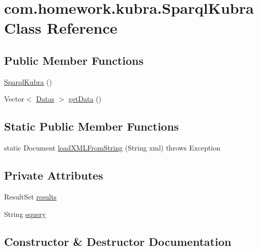 \hypertarget{classcom_1_1homework_1_1kubra_1_1_sparql_kubra}{}\section{com.\+homework.\+kubra.\+Sparql\+Kubra Class Reference}
\label{classcom_1_1homework_1_1kubra_1_1_sparql_kubra}
\subsection*{Public Member Functions}
\begin{DoxyCompactItemize}
\item 
\hyperlink{classcom_1_1homework_1_1kubra_1_1_sparql_kubra_ae62b5b33c88511096ef5a72be1a646e2}{Sparql\+Kubra} ()
\item 
Vector$<$ \hyperlink{classcom_1_1homework_1_1kubra_1_1_datas}{Datas} $>$ \hyperlink{classcom_1_1homework_1_1kubra_1_1_sparql_kubra_af79b43ae8f706a77de72ee034186ad42}{get\+Data} ()
\end{DoxyCompactItemize}
\subsection*{Static Public Member Functions}
\begin{DoxyCompactItemize}
\item 
static Document \hyperlink{classcom_1_1homework_1_1kubra_1_1_sparql_kubra_ad682c5907c45fbb128a25d1f005a0821}{load\+X\+M\+L\+From\+String} (String xml)  throws Exception 	
\end{DoxyCompactItemize}
\subsection*{Private Attributes}
\begin{DoxyCompactItemize}
\item 
Result\+Set \hyperlink{classcom_1_1homework_1_1kubra_1_1_sparql_kubra_a629f92dd7ffcb848a72e463438940a43}{results}
\item 
String \hyperlink{classcom_1_1homework_1_1kubra_1_1_sparql_kubra_a6e0744704f50f57b03d954cbb018cd27}{squery}
\end{DoxyCompactItemize}


\subsection{Constructor \& Destructor Documentation}
